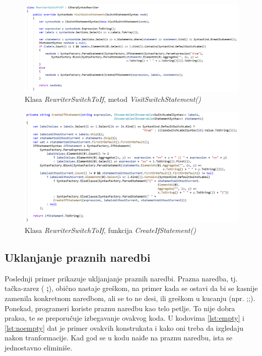 \documentclass[a4paper]{article}
\begin{document}
{		
		\begin{figure}[!htb]
			\begin{center}
				\includegraphics[scale=0.44]{images/RewriterSwitchToIf_part1.png}
			\end{center}
			\caption{Klasa \textit{RewriterSwitchToIf}, metod \textit{VisitSwitchStatement()}}
			\label{fig:RewriterSwitchToIf_part1}
		\end{figure}
		
		\begin{figure}[!htb]
			\begin{center}
				\includegraphics[scale=0.44]{images/RewriterSwitchToIf_part2.png}
			\end{center}
			\caption{Klasa \textit{RewriterSwitchToIf}, funkcija \textit{CreateIfStatement()}}
			\label{fig:RewriterSwitchToIf_part2}
		\end{figure}
		
		\subsection{Uklanjanje praznih naredbi}
		\label{subsec:prazne}
		Poslednji primer prikazuje ukljanjanje praznih naredbi. Prazna naredba, tj. tačka-zarez ( \textbf{;}), obično nastaje greškom, na primer kada se ostavi da bi se kasnije zamenila konkretnom naredbom, ali se to ne desi, ili greškom u kucanju (npr. ;;). Ponekad, programeri koriste praznu naredbu kao telo petlje. To nije dobra praksa, te se preporučuje izbegavanje ovakvog koda. U kodovima \ref{lst:empty} i \ref{lst:noempty} dat je primer ovakvih konstrukata i kako oni treba da izgledaju nakon tranformacije. Kad god se u kodu naiđe na praznu naredbu, ista se jednostavno eliminiše. 
		
}
\end{document}

